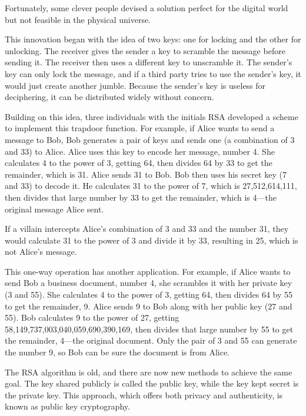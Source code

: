 \documentclass[11pt]{article}
\begin{document}
Fortunately, some clever people devised a solution perfect for the digital world but not feasible in the physical universe.

This innovation began with the idea of two keys: one for locking and the other for unlocking. The receiver gives the sender a key to scramble the message before sending it. The receiver then uses a different key to unscramble it. The sender's key can only lock the message, and if a third party tries to use the sender's key, it would just create another jumble. Because the sender's key is useless for deciphering, it can be distributed widely without concern.

Building on this idea, three individuals with the initials RSA developed a scheme to implement this trapdoor function. For example, if Alice wants to send a message to Bob, Bob generates a pair of keys and sends one (a combination of 3 and 33) to Alice. Alice uses this key to encode her message, number 4. She calculates 4 to the power of 3, getting 64, then divides 64 by 33 to get the remainder, which is 31. Alice sends 31 to Bob. Bob then uses his secret key (7 and 33) to decode it. He calculates 31 to the power of 7, which is 27,512,614,111, then divides that large number by 33 to get the remainder, which is 4—the original message Alice sent.

If a villain intercepts Alice's combination of 3 and 33 and the number 31, they would calculate 31 to the power of 3 and divide it by 33, resulting in 25, which is not Alice's message.

This one-way operation has another application. For example, if Alice wants to send Bob a business document, number 4, she scrambles it with her private key (3 and 55). She calculates 4 to the power of 3, getting 64, then divides 64 by 55 to get the remainder, 9. Alice sends 9 to Bob along with her public key (27 and 55). Bob calculates 9 to the power of 27, getting 58,149,737,003,040,059,690,390,169, then divides that large number by 55 to get the remainder, 4—the original document. Only the pair of 3 and 55 can generate the number 9, so Bob can be sure the document is from Alice.

The RSA algorithm is old, and there are now new methods to achieve the same goal. The key shared publicly is called the public key, while the key kept secret is the private key. This approach, which offers both privacy and authenticity, is known as public key cryptography.
\end{document}
